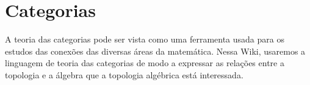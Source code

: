 \section{Categorias}
\label{categorias}


A teoria das categorias pode ser vista como uma ferramenta usada para os estudos das conexões das diversas áreas da matemática. Nessa Wiki, usaremos a linguagem de teoria das categorias de modo a expressar as relações entre a topologia e a álgebra que a topologia algébrica está interessada.

 









